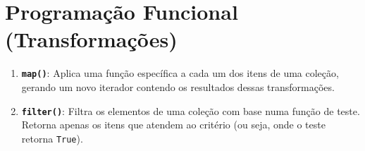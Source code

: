 \documentclass[11pt,a4paper]{article}
\begin{document}
\section{Programação Funcional (Transformações)}
\begin{enumerate}[label=\arabic*., leftmargin=*, resume]
    \item \textbf{\texttt{map()}}: Aplica uma função específica a cada um dos itens de uma coleção, gerando um novo iterador contendo os resultados dessas transformações.
    \item \textbf{\texttt{filter()}}: Filtra os elementos de uma coleção com base numa função de teste. Retorna apenas os itens que atendem ao critério (ou seja, onde o teste retorna \texttt{True}).
\end{enumerate}
\end{document}
